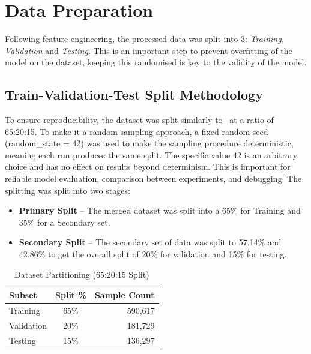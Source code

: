 \section{Data Preparation}
Following feature engineering, the processed data was split into 3: \textit{Training, Validation} and \textit{Testing}.
This is an important step to prevent overfitting of the model on the dataset, keeping this randomised is key to the validity of the model.
\subsection{Train-Validation-Test Split Methodology}
To ensure reproducibility, the dataset was split similarly to~\citet{Nunes2019, Lorenz2019} at a ratio of 65:20:15.
To make it a random sampling approach, a fixed random seed (random\_state = 42) was used to make the sampling procedure deterministic, meaning each run produces the same split.
The specific value 42 is an arbitrary choice and has no effect on results beyond determinism.
This is important for reliable model evaluation, comparison between experiments, and debugging.
The splitting was split into two stages:
\begin{itemize}
    \item \textbf{Primary Split} – The merged dataset was split into a 65\% for Training and 35\% for a Secondary set.
    \item \textbf{Secondary Split} – The secondary set of data was split to 57.14\% and 42.86\% to get the overall split of 20\% for validation and 15\% for testing.
\end{itemize}

\begin{table}[htbp]
\centering
\caption{Dataset Partitioning (65:20:15 Split)}
\label{tab:dataset-split}
\begin{tabular}{lcr}
\toprule
\textbf{Subset} & \textbf{Split \%} & \textbf{Sample Count} \\
\midrule
Training   & 65\% & 590,617 \\
Validation & 20\% & 181,729 \\
Testing    & 15\% & 136,297 \\
\bottomrule
\end{tabular}
\end{table}
